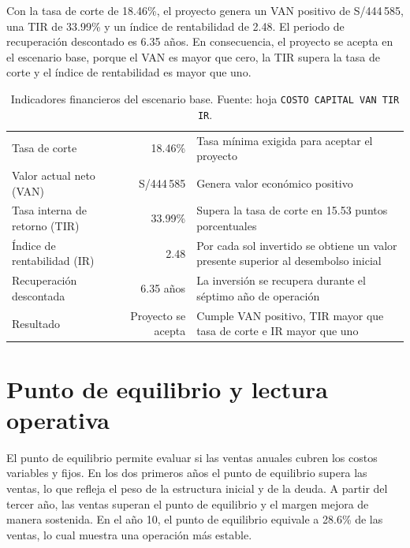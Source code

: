 Con la tasa de corte de 18.46\%, el proyecto genera un VAN positivo de S/444\,585, una TIR de 33.99\% y un índice de rentabilidad de 2.48. El periodo de recuperación descontado es 6.35 años. En consecuencia, el proyecto se acepta en el escenario base, porque el VAN es mayor que cero, la TIR supera la tasa de corte y el índice de rentabilidad es mayor que uno.

\begin{table}[H]
	\centering
	\footnotesize
	\mqiTableSetup
	\begin{tabular}{|p{5.9cm}|r|p{5.7cm}|}
		\hline
		\mqiTitle{3}{INDICADORES FINANCIEROS}
		\mqiHead \mqiWhite{Indicador} & \mqiWhite{Resultado} & \mqiWhite{Lectura} \\ \hline
		\mqiA Tasa de corte & 18.46\% & Tasa mínima exigida para aceptar el proyecto \\ \hline
		\mqiB Valor actual neto (VAN) & S/444\,585 & Genera valor económico positivo \\ \hline
		\mqiA Tasa interna de retorno (TIR) & 33.99\% & Supera la tasa de corte en 15.53 puntos porcentuales \\ \hline
		\mqiB Índice de rentabilidad (IR) & 2.48 & Por cada sol invertido se obtiene un valor presente superior al desembolso inicial \\ \hline
		\mqiA Recuperación descontada & 6.35 años & La inversión se recupera durante el séptimo año de operación \\ \hline
		\mqiB Resultado & Proyecto se acepta & Cumple VAN positivo, TIR mayor que tasa de corte e IR mayor que uno \\ \hline
	\end{tabular}
	\caption[Indicadores financieros del proyecto]{Indicadores financieros del escenario base. Fuente: hoja \texttt{COSTO CAPITAL VAN TIR IR}.}
	\label{tab:indicadores-financieros-proyecto}
\end{table}

\section{Punto de equilibrio y lectura operativa}

El punto de equilibrio permite evaluar si las ventas anuales cubren los costos variables y fijos. En los dos primeros años el punto de equilibrio supera las ventas, lo que refleja el peso de la estructura inicial y de la deuda. A partir del tercer año, las ventas superan el punto de equilibrio y el margen mejora de manera sostenida. En el año 10, el punto de equilibrio equivale a 28.6\% de las ventas, lo cual muestra una operación más estable.

